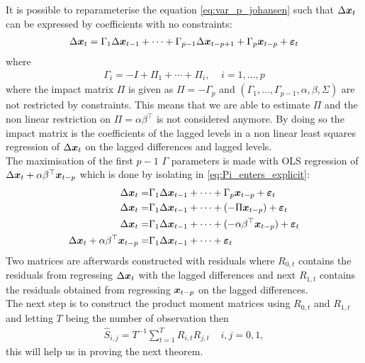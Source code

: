 \noindent It is possible to reparameterise the equation \eqref{eq:var_p_johansen} such that $\Delta \boldsymbol{x}_t$ can be expressed by coefficients with no constraints:
\begin{align}\label{eq:Pi_enters_explicit}
    \Delta \boldsymbol{x}_t=\Gamma_1\Delta \boldsymbol{x}_{t-1}+\cdots+\Gamma_{p-1}\Delta \boldsymbol{x}_{t-p+1}+\Gamma_{p}\boldsymbol{x}_{t-p}+\boldsymbol{\varepsilon}_t
\end{align}
where 
\begin{align*}
    \Gamma_i=-I+\Pi_1+\cdots+\Pi_i,\;\;\;\; i=1,\ldots,p
\end{align*}
where the impact matrix $\Pi$ is given as $\Pi=-\Gamma_p$ and $(\Gamma_1,\ldots,\Gamma_{p-1},\alpha,\beta,\Sigma)$ are not restricted by constraints. This means that we are able to estimate $\Pi$ and the non linear restriction on $\Pi=\alpha\beta^\top$ is not considered anymore. By doing so the impact matrix is the coefficients of the lagged levels in a non linear least squares regression of $\Delta \boldsymbol{x}_t$ on the lagged differences and lagged levels.\\
\noindent The maximisation of the first $p-1$ $\Gamma$ parameters is made with OLS regression of $\Delta \boldsymbol{x}_t+\alpha\beta^\top \boldsymbol{x}_{t-p}$ which is done by isolating in \eqref{eq:Pi_enters_explicit}:
\begin{align}
    \Delta \boldsymbol{x}_t=&\Gamma_1\Delta \boldsymbol{x}_{t-1}+\cdots+\Gamma_{p}\boldsymbol{x}_{t-p}+\boldsymbol{\varepsilon}_t\\
    \Delta \boldsymbol{x}_t=&\Gamma_1\Delta \boldsymbol{x}_{t-1}+\cdots+(-\Pi \boldsymbol{x}_{t-p})+\boldsymbol{\varepsilon}_t\\
    \Delta \boldsymbol{x}_t=&\Gamma_1\Delta \boldsymbol{x}_{t-1}+\cdots+(-\alpha\beta^\top \boldsymbol{x}_{t-p})+\boldsymbol{\varepsilon}_t\\
    \Delta \boldsymbol{x}_t+\alpha\beta^\top \boldsymbol{x}_{t-p}=&\Gamma_1\Delta \boldsymbol{x}_{t-1}+\cdots+\boldsymbol{\varepsilon}_t
\end{align}
Two matrices are afterwards constructed with residuals where $R_{0,t}$ contains the residuals from regressing $\Delta \boldsymbol{x}_t$ with the lagged differences and next $R_{1,t}$ contains the residuals obtained from regressing $\boldsymbol{x}_{t-p}$ on the lagged differences.\\
The next step is to construct the product moment matrices using $R_{0,t}$ and $R_{1,t}$ and letting $T$ being the number of observation then
\begin{align}\label{eq:prod_mom_mat}
\hat{S}_{i,j}=T^{-1}\sum_{t=1}^
T R_{i,t}R_{j,t}\;\;\;\; i,j=0,1,
\end{align}
this will help us in proving the next theorem.
